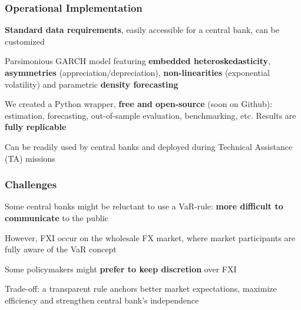 \documentclass{beamer}
\newenvironment{largeitemize}{\itemize\addtolength{\itemsep}{10pt}}{\enditemize}
\begin{document}
\begin{frame}
  \frametitle{Operational Implementation}
  \begin{largeitemize}
  \item \textbf{Standard data requirements}, easily accessible for a central
    bank, can be customized
  \item Parsimonious GARCH model featuring \textbf{embedded heteroskedasticity},  \textbf{asymmetries}
    (appreciation/depreciation), \textbf{non-linearities} (exponential
    volatility) and parametric \textbf{density forecasting}    
  \item We created a Python wrapper, \textbf{free and open-source}  (soon on Github): estimation, forecasting,
    out-of-sample evaluation, benchmarking, etc. Results are \textbf{fully replicable}
  \item Can be readily used by central banks and deployed during Technical
    Assistance (TA) missions
  \end{largeitemize}
\end{frame}


\begin{frame}
  \frametitle{Challenges}
  \begin{largeitemize}
      \item Some central banks might be reluctant to use a VaR-rule: \textbf{more
        difficult to communicate} to the public
        \begin{largeitemize}
      \item However, FXI occur on the wholesale FX market, where market
        participants are fully aware of the VaR concept
        \end{largeitemize}        
      \item Some policymakers might \textbf{prefer to keep discretion} over FXI
        \begin{largeitemize}
    \item Trade-off: a transparent rule anchors better market expectations,
      maximize efficiency and strengthen central bank's independence              
        \end{largeitemize}        
  \end{largeitemize}
\end{frame}
\end{document}
